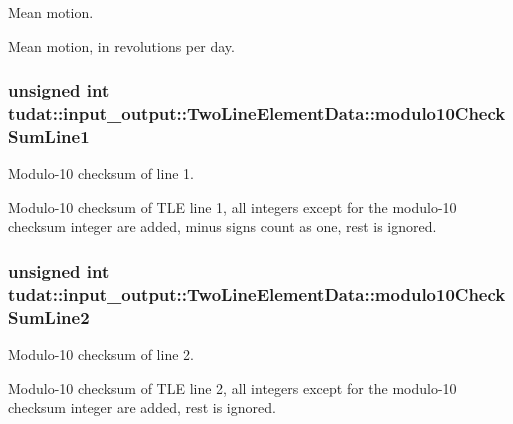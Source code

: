 Mean motion. 

Mean motion, in revolutions per day. 
\subsubsection[{\texorpdfstring{modulo10\+Check\+Sum\+Line1}{modulo10CheckSumLine1}}]{\setlength{\rightskip}{0pt plus 5cm}unsigned int tudat\+::input\+\_\+output\+::\+Two\+Line\+Element\+Data\+::modulo10\+Check\+Sum\+Line1}\hypertarget{structtudat_1_1input__output_1_1TwoLineElementData_ae5ad3d8d8e5e589c1ccb317b40443f85}{}\label{structtudat_1_1input__output_1_1TwoLineElementData_ae5ad3d8d8e5e589c1ccb317b40443f85}


Modulo-\/10 checksum of line 1. 

Modulo-\/10 checksum of T\+LE line 1, all integers except for the modulo-\/10 checksum integer are added, minus signs count as one, rest is ignored. 
\subsubsection[{\texorpdfstring{modulo10\+Check\+Sum\+Line2}{modulo10CheckSumLine2}}]{\setlength{\rightskip}{0pt plus 5cm}unsigned int tudat\+::input\+\_\+output\+::\+Two\+Line\+Element\+Data\+::modulo10\+Check\+Sum\+Line2}\hypertarget{structtudat_1_1input__output_1_1TwoLineElementData_a77315b4c45af60560bf32c182189f297}{}\label{structtudat_1_1input__output_1_1TwoLineElementData_a77315b4c45af60560bf32c182189f297}


Modulo-\/10 checksum of line 2. 

Modulo-\/10 checksum of T\+LE line 2, all integers except for the modulo-\/10 checksum integer are added, rest is ignored. 
